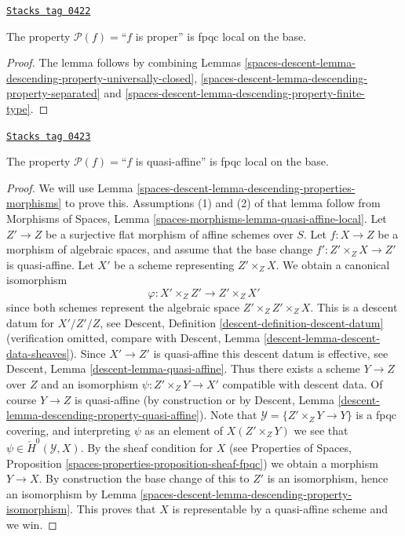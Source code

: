 \begin{lemma}
\label{spaces-descent-lemma-descending-property-proper}
\href{https://stacks.math.columbia.edu/tag/0422}{\texttt{Stacks tag 0422}}

The property $\mathcal{P}(f) =$``$f$ is proper''
is fpqc local on the base.
\end{lemma}

\begin{proof}
The lemma follows by combining
Lemmas \ref{spaces-descent-lemma-descending-property-universally-closed},
\ref{spaces-descent-lemma-descending-property-separated}
and \ref{spaces-descent-lemma-descending-property-finite-type}.
\end{proof}

\begin{lemma}
\label{spaces-descent-lemma-descending-property-quasi-affine}
\href{https://stacks.math.columbia.edu/tag/0423}{\texttt{Stacks tag 0423}}

The property $\mathcal{P}(f) =$``$f$ is quasi-affine''
is fpqc local on the base.
\end{lemma}

\begin{proof}
We will use
Lemma \ref{spaces-descent-lemma-descending-properties-morphisms}
to prove this. Assumptions (1) and (2) of that lemma follow from
Morphisms of Spaces,
Lemma \ref{spaces-morphisms-lemma-quasi-affine-local}.
Let $Z' \to Z$ be a surjective flat morphism of affine schemes over $S$.
Let $f : X \to Z$ be a morphism of algebraic spaces, and assume
that the base change $f' : Z' \times_Z X \to Z'$ is quasi-affine.
Let $X'$ be a scheme representing $Z' \times_Z X$.
We obtain a canonical isomorphism
$$
\varphi : X' \times_Z Z' \longrightarrow Z' \times_Z X'
$$
since both schemes represent the algebraic space $Z' \times_Z Z' \times_Z X$.
This is a descent datum for $X'/Z'/Z$, see
Descent, Definition \ref{descent-definition-descent-datum}
(verification omitted, compare with
Descent, Lemma \ref{descent-lemma-descent-data-sheaves}).
Since $X' \to Z'$ is quasi-affine this descent datum is effective, see
Descent, Lemma \ref{descent-lemma-quasi-affine}.
Thus there exists a scheme $Y \to Z$ over $Z$ and an
isomorphism $\psi : Z' \times_Z Y \to X'$ compatible with descent data.
Of course $Y \to Z$ is quasi-affine (by construction or by
Descent, Lemma \ref{descent-lemma-descending-property-quasi-affine}).
Note that $\mathcal{Y} = \{Z' \times_Z Y \to Y\}$ is a
fpqc covering, and interpreting $\psi$ as an element of
$X(Z' \times_Z Y)$ we see that $\psi \in \check{H}^0(\mathcal{Y}, X)$.
By the sheaf condition for $X$ (see
Properties of Spaces, Proposition
\ref{spaces-properties-proposition-sheaf-fpqc})
we obtain a morphism $Y \to X$.
By construction the base change of this to $Z'$ is an isomorphism, hence
an isomorphism by
Lemma \ref{spaces-descent-lemma-descending-property-isomorphism}.
This proves that $X$ is representable by a quasi-affine scheme and we win.
\end{proof}

